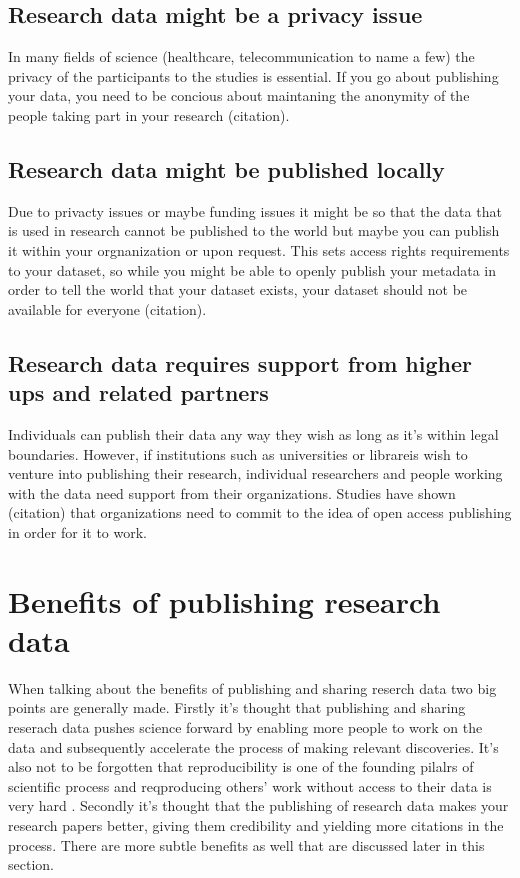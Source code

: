 \subsection{Research data might be a privacy issue}

In many fields of science (healthcare, telecommunication to name a few) the
privacy of the participants to the studies is essential. If you go about
publishing your data, you need to be concious about maintaning the anonymity
of the people taking part in your research (citation).

\subsection{Research data might be published locally}

Due to privacty issues or maybe funding issues it might be so that the data
that is used in research cannot be published to the world but maybe you can
publish it within your orgnanization or upon request. This sets access rights
requirements to your dataset, so while you might be able to openly publish
your metadata in order to tell the world that your dataset exists, your dataset
should not be available for everyone (citation). 

\subsection{Research data requires support from higher ups and related partners}

Individuals can publish their data any way they wish as long as it's within
legal boundaries. However, if institutions such as universities or librareis
wish to venture into publishing their research, individual researchers and
people working with the data need support from their organizations. Studies
have shown (citation) that organizations need to commit to the idea of open
access publishing in order for it to work.

\fi

\section{Benefits of publishing research data}
\label{sec:research_data_benefits}

When talking about the benefits of publishing and sharing reserch data two big
points are generally made. Firstly it's thought that publishing and sharing
reserach data pushes science forward by enabling more people to work on the
data and subsequently accelerate the process of making relevant discoveries.
It's also not to be forgotten that reproducibility is one of the founding
pilalrs of scientific process and reqproducing others' work without access
to their data is very hard \cite{jasny2011again}.
Secondly it's thought that the publishing of research data makes your
research papers better, giving them credibility and yielding more citations in
the process. There are more subtle benefits as well that are discussed later
in this section.

